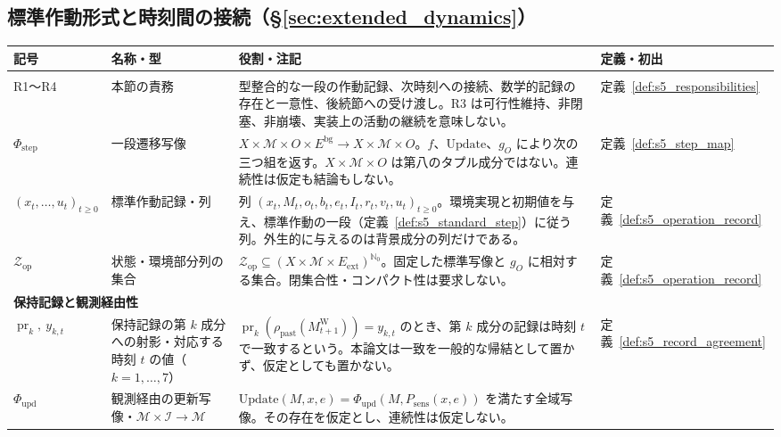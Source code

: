 \subsection{標準作動形式と時刻間の接続（\S\ref{sec:extended_dynamics}）}
\label{app:symbols_s5}

\begingroup
\small
\setlength{\tabcolsep}{4pt}
\renewcommand{\arraystretch}{1.18}
\begin{longtable}{p{3.0cm} p{3.0cm} p{6.6cm} p{2.0cm}}
\hline
\textbf{記号} & \textbf{名称・型} & \textbf{役割・注記} & \textbf{定義・初出} \\
\hline
\endhead
\hline
\endfoot
\multicolumn{4}{l}{\textbf{一段の作動形式と作動記録}} \\[2pt]
R1〜R4 & 本節の責務 &
型整合的な一段の作動記録、次時刻への接続、数学的記録の存在と一意性、後続節への受け渡し。R3 は可行性維持、非閉塞、非崩壊、実装上の活動の継続を意味しない。 &
定義~\ref{def:s5_responsibilities} \\[3pt]
$\Phi_{\mathrm{step}}$ & 一段遷移写像 &
$X\times\mathcal M\times O\times E^{\mathrm{bg}}\to X\times\mathcal M\times O$。$f$、$\mathrm{Update}$、$g_O$ により次の三つ組を返す。$X\times\mathcal M\times O$ は第八のタプル成分ではない。連続性は仮定も結論もしない。 &
定義~\ref{def:s5_step_map} \\[3pt]
$(x_t,\ldots,u_t)_{t\ge0}$ & 標準作動記録・列 &
列 $(x_t,M_t,o_t,b_t,e_t,I_t,r_t,v_t,u_t)_{t\ge0}$。環境実現と初期値を与え、標準作動の一段（定義~\ref{def:s5_standard_step}）に従う列。外生的に与えるのは背景成分の列だけである。 &
定義~\ref{def:s5_operation_record} \\[3pt]
$\mathcal Z_{\mathrm{op}}$ & 状態・環境部分列の集合 &
$\mathcal Z_{\mathrm{op}}\subseteq(X\times\mathcal M\times E_{\mathrm{ext}})^{\mathbb N_0}$。固定した標準写像と $g_O$ に相対する集合。閉集合性・コンパクト性は要求しない。 &
定義~\ref{def:s5_operation_record} \\[3pt]
\multicolumn{4}{l}{\textbf{保持記録と観測経由性}} \\[2pt]
$\operatorname{pr}_k,\ y_{k,t}$ & 保持記録の第 $k$ 成分への射影・対応する時刻 $t$ の値（$k=1,\ldots,7$） &
$\operatorname{pr}_k(\rho_{\mathrm{past}}(M^{\mathrm W}_{t+1}))=y_{k,t}$ のとき、第 $k$ 成分の記録は時刻 $t$ で一致するという。本論文は一致を一般的な帰結として置かず、仮定としても置かない。 &
定義~\ref{def:s5_record_agreement} \\[3pt]
$\Phi_{\mathrm{upd}}$ & 観測経由の更新写像・$\mathcal M\times\mathcal I\to\mathcal M$ &
$\mathrm{Update}(M,x,e)=\Phi_{\mathrm{upd}}(M,P_{\mathrm{sens}}(x,e))$ を満たす全域写像。その存在を仮定とし、連続性は仮定しない。 &

\end{longtable}
